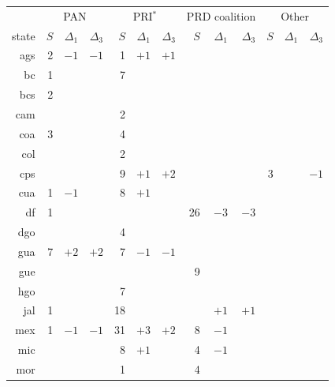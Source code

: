 \documentclass[letter,12pt]{article}
\begin{document}
\begin{table}
\begin{center}
\begin{tabular}{rrrr|rrr|rrr|rrr}
      & \multicolumn{3}{c}{PAN} & \multicolumn{3}{c}{PRI$^*$} & \multicolumn{3}{c}{PRD coalition} & \multicolumn{3}{c}{Other} \\
state &$S$& $\Delta_1$ &  $\Delta_3$ & $S$& $\Delta_1$ &  $\Delta_3$ & $S$& $\Delta_1$ &  $\Delta_3$ & $S$& $\Delta_1$ &  $\Delta_3$ \\ \hline
ags &   2 & $-1$& $-1$&   1 & $+1$& $+1$&      &      &       &    &    & \\       
 bc &   1 &     &     &   7 &     &     &      &      &       &    &    & \\       
bcs &   2 &     &     &     &     &     &      &      &       &    &    & \\       
cam &     &     &     &   2 &     &     &      &      &       &    &    & \\       \hdashline
coa &   3 &     &     &   4 &     &     &      &      &       &    &    & \\       
col &     &     &     &   2 &     &     &      &      &       &    &    & \\       
cps &     &     &     &   9 & $+1$& $+2$&      &      &       & 3  &    & $-1$ \\       
cua &   1 & $-1$&     &   8 & $+1$&     &      &      &       &    &    & \\       \hdashline
 df &   1 &     &     &     &     &     &   26 &  $-3$&  $-3$ &    &    & \\       
dgo &     &     &     &   4 &     &     &      &      &       &    &    & \\       
gua &   7 & $+2$& $+2$&   7 & $-1$& $-1$&      &      &       &    &    & \\       
gue &     &     &     &     &     &     &    9 &      &       &    &    & \\       \hdashline
hgo &     &     &     &   7 &     &     &      &      &       &    &    & \\       
jal &   1 &     &     &  18 &     &     &      &  $+1$&  $+1$ &    &    & \\       
mex &   1 & $-1$& $-1$&  31 & $+3$& $+2$&    8 &  $-1$&       &    &    & \\       
mic &     &     &     &   8 & $+1$&     &    4 &  $-1$&       &    &    & \\       \hdashline
mor &     &     &     &   1 &     &     &    4 &      &       &    &    & \\       

\end{tabular}
\end{center}
\end{table}
\end{document}
